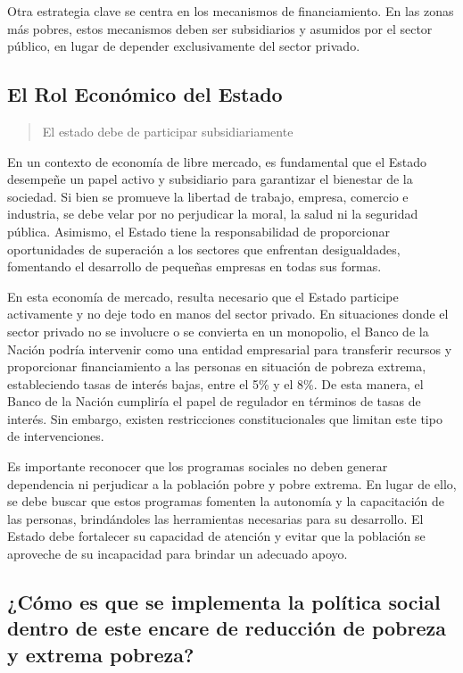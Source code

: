 \documentclass[
  jou,
  floatsintext,
  longtable,
  a4paper,
  nolmodern,
  notxfonts,
  notimes,
  12pt,
  colorlinks=true,linkcolor=blue,citecolor=blue,urlcolor=blue]{apa7}
\begin{document}
Otra estrategia clave se centra en los mecanismos de financiamiento. En
las zonas más pobres, estos mecanismos deben ser subsidiarios y asumidos
por el sector público, en lugar de depender exclusivamente del sector
privado.

\subsection{El Rol Económico del
Estado}\label{el-rol-econuxf3mico-del-estado}

\begin{quote}
El estado debe de participar subsidiariamente
\end{quote}

En un contexto de economía de libre mercado, es fundamental que el
Estado desempeñe un papel activo y subsidiario para garantizar el
bienestar de la sociedad. Si bien se promueve la libertad de trabajo,
empresa, comercio e industria, se debe velar por no perjudicar la moral,
la salud ni la seguridad pública. Asimismo, el Estado tiene la
responsabilidad de proporcionar oportunidades de superación a los
sectores que enfrentan desigualdades, fomentando el desarrollo de
pequeñas empresas en todas sus formas.

En esta economía de mercado, resulta necesario que el Estado participe
activamente y no deje todo en manos del sector privado. En situaciones
donde el sector privado no se involucre o se convierta en un monopolio,
el Banco de la Nación podría intervenir como una entidad empresarial
para transferir recursos y proporcionar financiamiento a las personas en
situación de pobreza extrema, estableciendo tasas de interés bajas,
entre el 5\% y el 8\%. De esta manera, el Banco de la Nación cumpliría
el papel de regulador en términos de tasas de interés. Sin embargo,
existen restricciones constitucionales que limitan este tipo de
intervenciones.

Es importante reconocer que los programas sociales no deben generar
dependencia ni perjudicar a la población pobre y pobre extrema. En lugar
de ello, se debe buscar que estos programas fomenten la autonomía y la
capacitación de las personas, brindándoles las herramientas necesarias
para su desarrollo. El Estado debe fortalecer su capacidad de atención y
evitar que la población se aproveche de su incapacidad para brindar un
adecuado apoyo.

\subsection{¿Cómo es que se implementa la política social dentro de este
encare de reducción de pobreza y extrema
pobreza?}\label{cuxf3mo-es-que-se-implementa-la-poluxedtica-social-dentro-de-este-encare-de-reducciuxf3n-de-pobreza-y-extrema-pobreza}
\end{document}
